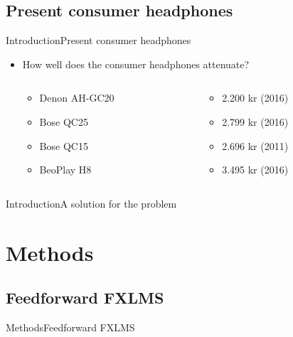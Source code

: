 \subsection{Present consumer headphones}
\begin{frame}{Introduction}{Present consumer headphones}
	\begin{itemize}	
	\item How well does the consumer headphones attenuate?
	\begin{columns}
		\begin{column}{0.27\textwidth}
		\begin{itemize}
			\item Denon AH-GC20
			\item Bose QC25 
			\item Bose QC15 	
			\item BeoPlay H8 	
		\end{itemize}
		\end{column}
		\begin{column}{0.6\textwidth} 
		\begin{itemize}
			\item[] 2.200 kr (2016)
			\item[] 2.799 kr (2016)
			\item[] 2.696 kr (2011)
			\item[] 3.495 kr (2016)
		\end{itemize}
		\end{column}
	\end{columns}
	\end{itemize}			
	\begin{center}
		
	\end{center}	
\end{frame}





\begin{frame}{Introduction}{A solution for the problem}		
\end{frame}


\section{Methods}

\subsection{Feedforward FXLMS}
\begin{frame}{Methods}{Feedforward FXLMS}		

\end{frame}


